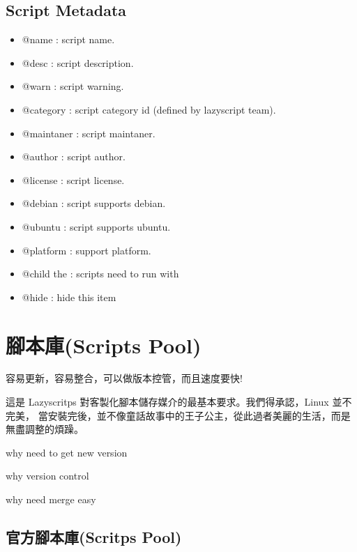 \documentclass[letterpaper,10pt,english]{manual}
\begin{document}
\section{Script Metadata}
\begin{itemize}
\item {} 
@name : script name.

\item {} 
@desc : script description.

\item {} 
@warn : script warning.

\item {} 
@category : script category id (defined by lazyscript team).

\item {} 
@maintaner : script maintaner.

\item {} 
@author : script author.

\item {} 
@license : script license.

\item {} 
@debian : script supports debian.

\item {} 
@ubuntu : script supports ubuntu.

\item {} 
@platform : support platform.

\item {} 
@child the : scripts need to run with

\item {} 
@hide : hide this item

\end{itemize}

\resetcurrentobjects


\chapter{腳本庫(Scripts Pool)}

容易更新，容易整合，可以做版本控管，而且速度要快!

這是 Lazyscritps 對客製化腳本儲存媒介的最基本要求。我們得承認，Linux 並不完美，
當安裝完後，並不像童話故事中的王子公主，從此過者美麗的生活，而是無盡調整的煩躁。

why need to get new version

why version control

why need merge easy


\section{官方腳本庫(Scritps Pool)}
\end{document}
